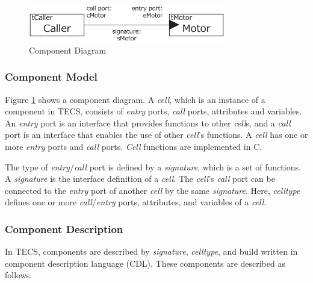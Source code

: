 \documentclass[conference]{IEEEtran/IEEEtran/IEEEtran}
\begin{document}
\begin{figure}[t]
    \centering
    \includegraphics[width=8.6cm,clip]{figure/component_diagram.eps}
    \vspace{-2mm}
    \caption{Component Diagram}
    \vspace{-2mm}
    \label{fig:component}
\end{figure}

\subsubsection{Component Model}
Figure \ref{fig:component} shows a component diagram.
A {\it cell}, which is an instance of a component in TECS, consists of {\it entry} ports, {\it call} ports, attributes and variables.
An {\it entry} port is an interface that provides functions to other {\it cell}s, and a {\it call} port is an interface that enables the use of other {\it cell}'s functions.
A {\it cell} has one or more {\it entry} ports and {\it call} ports.
{\it Cell} functions are implemented in C.

The type of {\it entry}/{\it call} port is defined by a {\it signature}, which is a set of functions.
A {\it signature} is the interface definition of a {\it cell}.
The {\it cell}'s  {\it call} port can be connected to the {\it entry} port of another {\it cell} by the same {\it signature}.
Here, {\it celltype} defines one or more {\it call}/{\it entry} ports, attributes, and variables of a {\it cell}.


\subsubsection{Component Description}
In TECS, components are described by {\it signature}, {\it celltype}, and build written in component description language (CDL).
These components are described as follows.
\end{document}
